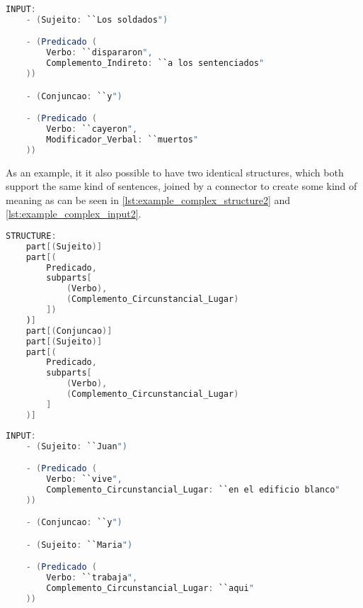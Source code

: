 \begin{center}
\begin{minipage}{10cm}
\begin{lstlisting}[language=java, basicstyle=\tiny, label={lst:example_complex_input}, caption=Example of a more complex sentence input]
INPUT:
    - (Sujeito: ``Los soldados")

    - (Predicado (
        Verbo: ``dispararon",
        Complemento_Indireto: ``a los sentenciados"
    ))

    - (Conjuncao: ``y")

    - (Predicado (
        Verbo: ``cayeron",
        Modificador_Verbal: ``muertos"
    ))
\end{lstlisting}
\end{minipage}
\end{center}

As an example, it it also possible to have two identical structures, which both support the same kind of sentences,
joined by a connector to create some kind of meaning as can be seen in \autoref{lst:example_complex_structure2} and \autoref{lst:example_complex_input2}.

\begin{center}
\begin{minipage}{11cm}
\begin{lstlisting}[language=java, basicstyle=\tiny, label={lst:example_complex_structure2}, caption=Example of a complex sentence structure]
STRUCTURE:
    part[(Sujeito)]
    part[(
        Predicado,
        subparts[
            (Verbo),
            (Complemento_Circunstancial_Lugar)
        ])
    )]
    part[(Conjuncao)]
    part[(Sujeito)]
	part[(
        Predicado,
        subparts[
            (Verbo),
            (Complemento_Circunstancial_Lugar)
        ]
    )]
\end{lstlisting}
\end{minipage}
\end{center}


\begin{center}
\begin{minipage}{11cm}
\begin{lstlisting}[language=java, basicstyle=\tiny, label={lst:example_complex_input2}, caption=Example of a complex sentence input]
INPUT:
    - (Sujeito: ``Juan")

    - (Predicado (
        Verbo: ``vive",
        Complemento_Circunstancial_Lugar: ``en el edificio blanco"
    ))

    - (Conjuncao: ``y")

    - (Sujeito: ``Maria")

    - (Predicado (
        Verbo: ``trabaja",
        Complemento_Circunstancial_Lugar: ``aqui"
    ))
\end{lstlisting}
\end{minipage}
\end{center}

